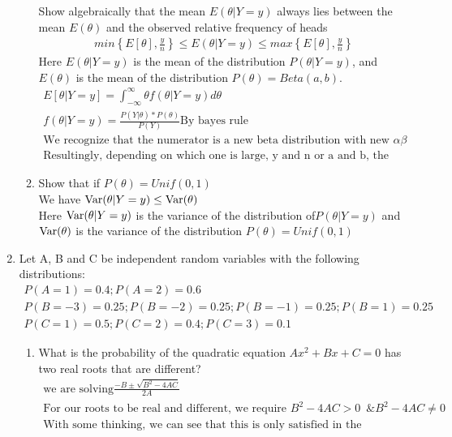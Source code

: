 \documentclass[11pt]{article}
\newcommand{\Var}{\mathop{\rm Var}}
\begin{document}
\begin{enumerate}
\begin{enumerate}
			Show algebraically that the mean $E(\theta | Y = y)$ always lies between the mean $E(\theta)$ and the observed
			relative frequency of heads
			\begin{gather}
			min\left\{E[\theta],\frac{y}{n}\right\}\le E(\theta | Y = y) \le max\left\{E[\theta],\frac{y}{n}\right\}
			\end{gather}
			Here $E(\theta| Y = y)$ is the mean of the distribution $P(\theta | Y = y)$, and $E(\theta)$ is the mean of the distribution
			$P(\theta) = Beta(a, b)$.
			\begin{gather}
			E[\theta|Y=y] = \int_{-\infty}^{\infty} \theta f(\theta|Y=y) d\theta\\
			f(\theta|Y=y)=\frac{P(Y|\theta) * P(\theta)}{P(Y)} \text{By bayes rule}\\
			\text{We recognize that the numerator is a new beta distribution with new } \alpha \beta\\
			\text{Resultingly, depending on which one is large, y and n or a and b, the exepected alue will lie between them?}
			\end{gather}
			\item Show that if $P(\theta) = Unif(0,1)$\\
			We have $\Var(\theta|Y=y)\le \Var(\theta)$\\
			Here $\Var(\theta|Y=y)$ is the variance of the distribution of$ P(\theta |Y=y)$ and $\Var(\theta)$ is the variance of the distribution $P(\theta) = Unif(0,1)$
		\end{enumerate}
		\item
		Let A, B and C be independent random variables with the following distributions:
		\begin{gather}
		P(A = 1) = 0.4; P(A = 2) = 0.6\\
		P(B = -3) = 0.25; P(B = -2) = 0.25; P(B = -1) = 0.25; P(B = 1) = 0.25\\
		P(C = 1) = 0.5; P(C = 2) = 0.4; P(C = 3) = 0.1
		\end{gather}
		\begin{enumerate}
			\item What is the probability of the quadratic equation $Ax^2+Bx+C=0$ has two real roots that are different?
			\begin{gather}
			\text{we are solving} \frac{-B \pm \sqrt{B^2-4AC}}{2A}\\
			\text{For our roots to be real and different, we require } B^2-4AC > 0 \, \, \, \& B^2-4AC \ne 0\\
			\text{With some thinking, we can see that this is only satisfied in the following cases}\\

\end{gather}
\end{enumerate}
\end{enumerate}
\end{document}
